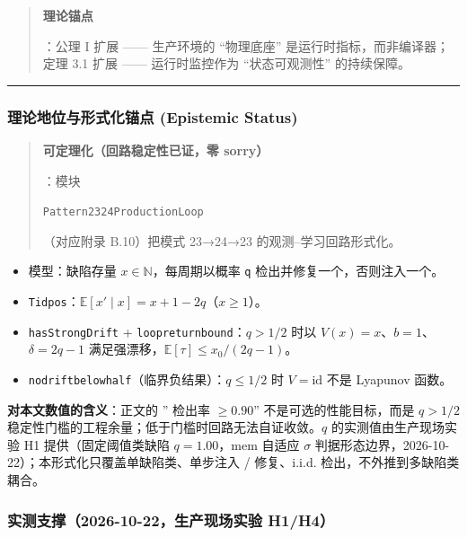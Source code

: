 \documentclass[
]{ctexart}
\renewcommand{\_}{\discretionary{}{}{\textunderscore}}
\begin{document}
\begin{quote}
\textbf{理论锚点}

：公理 I 扩展 ------ 生产环境的 ``物理底座''
是运行时指标，而非编译器；定理 3.1 扩展 ------ 运行时监控作为
``状态可观测性'' 的持续保障。
\end{quote}

\begin{center}\rule{0.5\linewidth}{0.5pt}\end{center}

\subsubsection{理论地位与形式化锚点 (Epistemic
Status)}\label{ux7406ux8bbaux5730ux4f4dux4e0eux5f62ux5f0fux5316ux951aux70b9-epistemic-status-1}

\begin{quote}
\textbf{可定理化（回路稳定性已证，零 sorry）}

：模块

\texttt{Pattern23\_24\_ProductionLoop}

（对应附录 B.10）把模式 23→24→23 的观测--学习回路形式化。
\end{quote}

\begin{itemize}
\item
  模型：缺陷存量 \(x\in\mathbb N\)，每周期以概率 \texttt{q}
  检出并修复一个，否则注入一个。
\item
  \texttt{T\_id\_pos}：\(\mathbb E[x'\mid x]=x+1-2q\)（\(x\ge1\)）。
\item
  \texttt{hasStrongDrift} + \texttt{loop\_return\_bound}：\(q>1/2\) 时以
  \(V(x)=x\)、\(b=1\)、\(\delta=2q-1\)
  满足强漂移，\(\mathbb E[\tau]\le x_0/(2q-1)\)。
\item
  \texttt{no\_drift\_below\_half}（临界负结果）：\(q\le1/2\) 时
  \(V=\mathrm{id}\) 不是 Lyapunov 函数。
\end{itemize}

\textbf{对本文数值的含义}：正文的 '' 检出率 \(\ge0.90\)''
不是可选的性能目标，而是 \(q>1/2\)
稳定性门槛的工程余量；低于门槛时回路无法自证收敛。\(q\)
的实测值由生产现场实验 H1 提供（固定阈值类缺陷 \(q=1.00\)，mem 自适应
\(\sigma\) 判据形态边界，2026-10-22）；本形式化只覆盖单缺陷类、单步注入
/ 修复、i.i.d. 检出，不外推到多缺陷类耦合。

\subsubsection{实测支撑（2026-10-22，生产现场实验
H1/H4）}\label{ux5b9eux6d4bux652fux64912026-10-22ux751fux4ea7ux73b0ux573aux5b9eux9a8c-h1h4}
\end{document}
